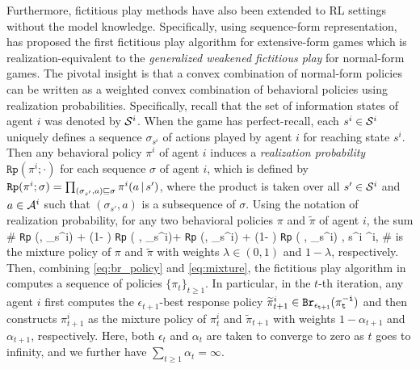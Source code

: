  
 Furthermore, fictitious play methods have also been extended to RL settings without the model knowledge.  Specifically,  using  sequence-form representation,
 \cite{heinrich2015fictitious}  has proposed the first fictitious play algorithm  for extensive-form games which is realization-equivalent to the \textit{generalized weakened fictitious play} \cite{leslie2006generalised} for normal-form games. 
 The pivotal insight is that a convex combination of normal-form policies can be written as a weighted convex combination of behavioral policies using realization  probabilities. 
 Specifically,  recall that  the set of information states of agent $i$ was denoted by $\cS^i$.  
 When the game has perfect-recall, each $s^i \in \cS^i$ uniquely defines a sequence $\sigma_{s^i}$ of actions played by agent $i$ for reaching state $s^i$.  Then any behavioral policy $\pi^i$ of agent $i$ induces a \textit{realization probability} $\texttt{Rp}(\pi^i;  \cdot  )$  for each  sequence $\sigma$ of agent $i$, which is defined by $\texttt{Rp}(\pi^i;  \sigma ) = \prod_{(\sigma_{s'},  a) \sqsubseteq \sigma } \pi^i( a \given s') $, where the product is taken over all $s' \in \cS^i$ and $a\in \cA^i$ such that   $(\sigma_{s'} , a) $ is a subsequence of $\sigma$. 
 Using the notation of realization probability, for any two behavioral policies  $\pi$ and $\tilde \pi$ of agent $i$,  the sum 
 \#\label{eq:mixture}
     { \lambda \cdot \texttt{Rp} (\pi, \sigma_{s^i})  + (1- \lambda) \cdot \texttt{Rp} ( \tilde \pi  , \sigma_{s^i})}+    { \lambda \cdot \texttt{Rp} (\pi, \sigma_{s^i})  + (1- \lambda) \cdot \texttt{Rp} ( \tilde \pi , \sigma_{s^i})}  , \qquad \forall s^i \in \cS^i, 
 \#
is the mixture policy of  $\pi$ and $\tilde \pi$ with weights $\lambda \in (0,1)$ and $1-\lambda$, respectively. 
Then, combining \eqref{eq:br_policy} and  \eqref{eq:mixture},  the  fictitious play algorithm in \cite{heinrich2015fictitious}   computes a sequence of policies $\{ \pi_t \}_{t\geq 1}$.  
In particular, 
in the $t$-th iteration,  any agent $i$ first computes the $\epsilon_{t+1}$-best response policy $\tilde \pi_{t+1} ^i \in  \tt{Br}_{\epsilon_{t+1}}(\pi^{-i}_t)$ and then  constructs $\pi^i_{t+1}$ as  the mixture policy of $\pi^i_{t}$ and $\tilde \pi_{t+1}$ with weights $1- \alpha_{t+1}$ and $\alpha_{t+1}$, respectively.  Here,  both $\epsilon_t$  and $\alpha_t $ are taken to converge to zero as $t$ goes to infinity, and we further have $\sum_{t\geq 1} \alpha_t = \infty$. 
